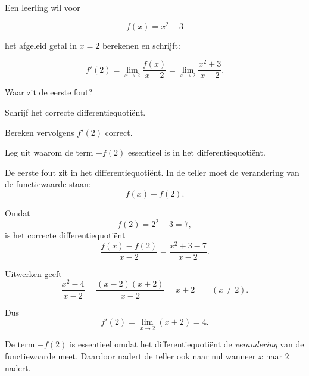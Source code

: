 \documentclass{ximera}
\begin{document}

\begin{oefening}{\oefU\ESS}

Een leerling wil voor

\[
f(x)=x^2+3
\]

het afgeleid getal in $x=2$ berekenen en schrijft:

\[
f'(2)
=
\lim_{x\to2}
\frac{f(x)}{x-2}
=
\lim_{x\to2}
\frac{x^2+3}{x-2}.
\]

\begin{question}
Waar zit de eerste fout?
\end{question}

\begin{question}
Schrijf het correcte differentiequotiënt.
\end{question}

\begin{question}
Bereken vervolgens $f'(2)$ correct.
\end{question}

\begin{question}
Leg uit waarom de term $-f(2)$ essentieel is in het
differentiequotiënt.
\end{question}

\begin{oplossing}

De eerste fout zit in het differentiequotiënt. In de teller moet de
verandering van de functiewaarde staan:
\[
f(x)-f(2).
\]

Omdat
\[
f(2)=2^2+3=7,
\]
is het correcte differentiequotiënt
\[
\frac{f(x)-f(2)}{x-2}
=
\frac{x^2+3-7}{x-2}.
\]

Uitwerken geeft
\[
\frac{x^2-4}{x-2}
=
\frac{(x-2)(x+2)}{x-2}
=
x+2
\qquad (x\neq2).
\]

Dus
\[
f'(2)
=
\lim_{x\to2}(x+2)
=
\boxed{4}.
\]

De term $-f(2)$ is essentieel omdat het differentiequotiënt de
\emph{verandering} van de functiewaarde meet. Daardoor nadert de teller
ook naar nul wanneer $x$ naar $2$ nadert.

\end{oplossing}

\end{oefening}


\end{document}
